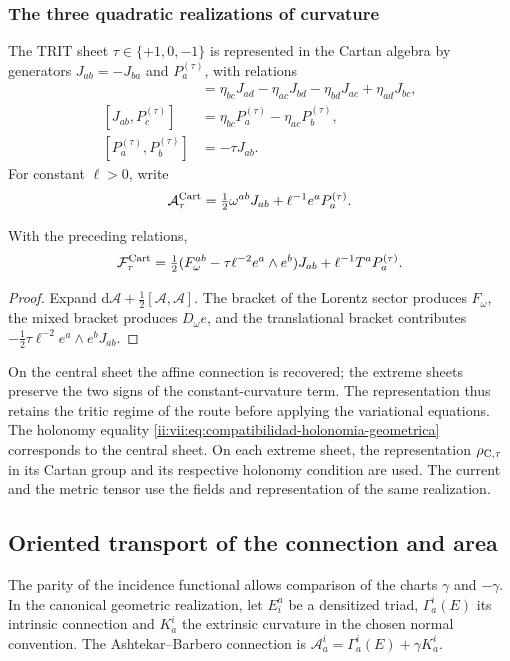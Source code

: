 \subsubsection{The three quadratic realizations of curvature}

The TRIT sheet \(\tau\in\{+1,0,-1\}\) is represented in
the Cartan algebra by generators \(J_{ab}=-J_{ba}\)
and \(P_a^{(\tau)}\), with relations
\begin{align*}
 [J_{ab},J_{cd}]&=
 \eta_{bc}J_{ad}-\eta_{ac}J_{bd}
 -\eta_{bd}J_{ac}+\eta_{ad}J_{bc},\\
 [J_{ab},P_c^{(\tau)}]&=
 \eta_{bc}P_a^{(\tau)}-\eta_{ac}P_b^{(\tau)},\\
 [P_a^{(\tau)},P_b^{(\tau)}]&=-\tau J_{ab}.
\end{align*}
For constant \(\ell>0\), write
\[
 \mathcal A_\tau^{\rm Cart}
 =\tfrac12\omega^{ab}J_{ab}+\ell^{-1}e^aP_a^{(\tau)}.
\]

\begin{proposition}
\label{ii:vii:prop:curvatura-tritificada}
With the preceding relations,
\begin{equation}
 \mathcal F_\tau^{\rm Cart}
 =\tfrac12(F_\omega^{ab}-\tau\ell^{-2}e^a\wedge e^b)J_{ab}
     +\ell^{-1}T^aP_a^{(\tau)}.
 \label{ii:vii:eq:curvatura-tritificada}
\end{equation}
\end{proposition}
\begin{proof}
Expand \(\mathrm d\mathcal A+\tfrac12[\mathcal A,\mathcal A]\).
The bracket of the Lorentz sector produces \(F_\omega\), the
mixed bracket produces \(D_\omega e\), and the translational
bracket contributes
\(-\tfrac12\tau\ell^{-2}e^a\wedge e^bJ_{ab}\).
\end{proof}

On the central sheet the affine connection is recovered; the extreme sheets
preserve the two signs of the constant-curvature term. The
representation thus retains the tritic regime of the route before
applying the variational equations. The holonomy equality
\eqref{ii:vii:eq:compatibilidad-holonomia-geometrica} corresponds to the
central sheet. On each extreme sheet, the representation
\(\rho_{{\rm C},\tau}\) in its Cartan group and its respective holonomy
condition are used. The current and the metric tensor use
the fields and representation of the same realization.



\subsection{Oriented transport of the connection and area}
\label{ii:sec:ii-costura-barbero}
The parity of the incidence functional allows comparison of the charts
\(\gamma\) and \(-\gamma\). In the canonical geometric realization,
let \(E^a_i\) be a densitized triad, \(\Gamma_a^i(E)\) its
intrinsic connection and \(K_a^i\) the extrinsic curvature in the
chosen normal convention. The Ashtekar--Barbero connection is
\(\mathcal A_a^i=\Gamma_a^i(E)+\gamma K_a^i\).

